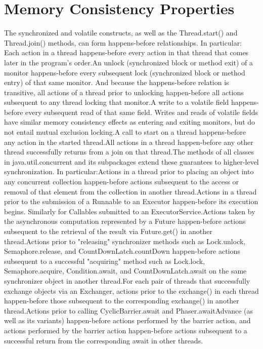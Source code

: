 \documentclass[12pt,a4paper]{report}%
\begin{document}
\section{Memory Consistency Properties}

 The synchronized and volatile constructs, as well as the Thread.start() and Thread.join() methods, can form happens-before relationships. In particular:
Each action in a thread happens-before every action in that thread that comes later in the program's order.An unlock (synchronized block or method exit) of a monitor happens-before every subsequent lock (synchronized block or method entry) of that same monitor. And because the happens-before relation is transitive, all actions of a thread prior to unlocking happen-before all actions subsequent to any thread locking that monitor.A write to a volatile field happens-before every subsequent read of that same field. Writes and reads of volatile fields have similar memory consistency effects as entering and exiting monitors, but do not entail mutual exclusion locking.A call to start on a thread happens-before any action in the started thread.All actions in a thread happen-before any other thread successfully returns from a join on that thread.The methods of all classes in java.util.concurrent and its subpackages extend these guarantees to higher-level synchronization. In particular:Actions in a thread prior to placing an object into any concurrent collection happen-before actions subsequent to the access or removal of that element from the collection in another thread.Actions in a thread prior to the submission of a Runnable to an Executor happen-before its execution begins. Similarly for Callables submitted to an ExecutorService.Actions taken by the asynchronous computation represented by a Future happen-before actions subsequent to the retrieval of the result via Future.get() in another thread.Actions prior to "releasing" synchronizer methods such as Lock.unlock, Semaphore.release, and CountDownLatch.countDown happen-before actions subsequent to a successful "acquiring" method such as Lock.lock, Semaphore.acquire, Condition.await, and CountDownLatch.await on the same synchronizer object in another thread.For each pair of threads that successfully exchange objects via an Exchanger, actions prior to the exchange() in each thread happen-before those subsequent to the corresponding exchange() in another thread.Actions prior to calling CyclicBarrier.await and Phaser.awaitAdvance (as well as its variants) happen-before actions performed by the barrier action, and actions performed by the barrier action happen-before actions subsequent to a successful return from the corresponding await in other threads.
\end{document}
